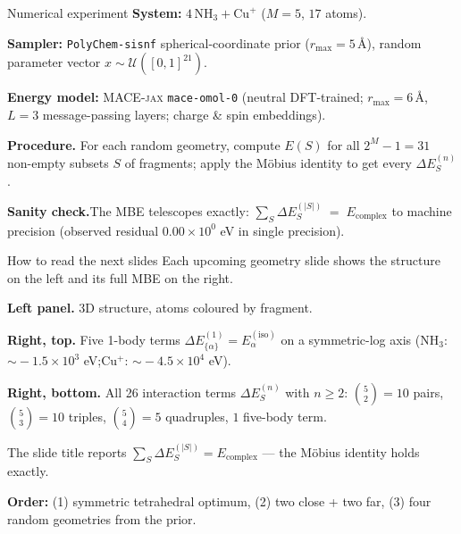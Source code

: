 \documentclass[aspectratio=169,11pt]{beamer}
\newcommand{\Eiso}{E^{(\mathrm{iso})}}
\newcommand{\Ecpl}{E_{\mathrm{complex}}}
\begin{document}
\begin{frame}{Numerical experiment}
\textbf{System:} $4\,\mathrm{NH}_3 + \mathrm{Cu}^{+}$ \;($M=5$, $17$ atoms).

\textbf{Sampler:} \texttt{PolyChem-sisnf} spherical-coordinate prior
($r_{\max}=5\,$\AA), random parameter vector
$x\sim\mathcal{U}([0,1]^{21})$.

\textbf{Energy model:} \textsc{MACE-jax} \texttt{mace-omol-0}
(neutral DFT-trained; $r_{\max}=6\,$\AA, $L=3$ message-passing layers;
charge \& spin embeddings).

\textbf{Procedure.} For each random geometry, compute
$E(S)$ for all $2^{M}-1=31$ non-empty subsets $S$ of fragments;
apply the M\"obius identity to get every $\Delta E^{(n)}_S$.

\bigskip
\textbf{Sanity check.}\;\;The MBE telescopes exactly:
$\displaystyle \sum_{S}\Delta E^{(|S|)}_S \;=\; \Ecpl$ to machine precision
(observed residual $0.00\times 10^{0}$ eV in single precision).
\end{frame}

\begin{frame}{How to read the next slides}
\small
Each upcoming geometry slide shows the structure on the left and its
full MBE on the right.

\medskip
\textbf{Left panel.} 3D structure, atoms coloured by fragment.

\medskip
\textbf{Right, top.} Five 1-body terms
$\Delta E^{(1)}_{\{\alpha\}}=\Eiso_\alpha$ on a symmetric-log axis
(NH$_3$: $\sim\!-1.5\times10^{3}$ eV;\;Cu$^{+}$: $\sim\!-4.5\times10^{4}$ eV).

\medskip
\textbf{Right, bottom.} All 26 interaction terms $\Delta E^{(n)}_S$
with $n\ge2$:
\(\binom{5}{2}{=}10\) pairs,\;
\(\binom{5}{3}{=}10\) triples,\;
\(\binom{5}{4}{=}5\) quadruples,\;
\(1\) five-body term.

\medskip
The slide title reports
$\sum_S \Delta E^{(|S|)}_S = \Ecpl$ --- the M\"obius identity holds
exactly.

\bigskip
\textbf{Order:}\;
(1) symmetric tetrahedral optimum,\;
(2) two close + two far,\;
(3) four random geometries from the prior.
\end{frame}
\end{document}
